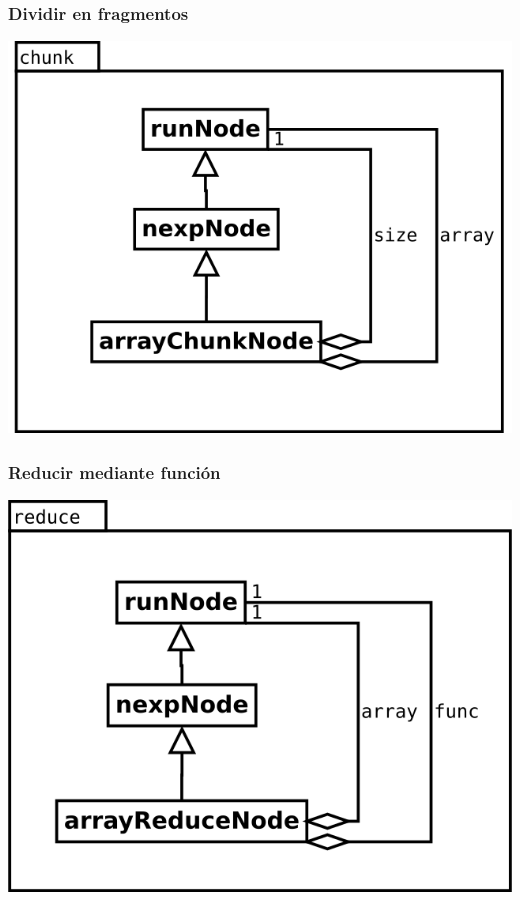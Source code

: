 \subsubsection {Dividir en fragmentos}
\begin{center}
\includegraphics[scale=0.4]{chunk.png} \\
\end{center}

\subsubsection {Reducir mediante función}
\begin{center}
\includegraphics[scale=0.4]{reduce.png} \\
\end{center}

